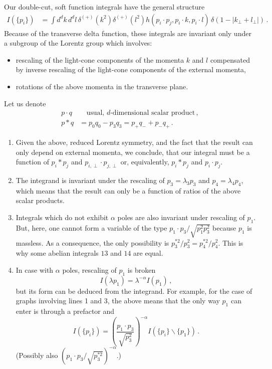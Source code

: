 \documentclass[a4paper,11pt]{report}
\numberwithin{equation}{section}
\begin{document}
Our double-cut, soft function integrals have the general structure
%
\begin{align}
I(\{p_i\}) &= \int d^dk\, d^d l\, \delta^{(+)}(k^2) \delta^{(+)}(l^2)
     h(p_i\cdot p_j, p_i\cdot k, p_i \cdot l)\,
     \delta(1-|k_\perp+l_\perp|)\,.
\end{align}
%
Because of the transverse delta function, these integrals are invariant
only under a subgroup of the Lorentz group which involves:
%
\begin{itemize}
  \item
  rescaling of the light-cone components of the momenta $k$ and $l$ compensated
  by inverse rescaling of the light-cone components of the external momenta,
  \item
  rotations of the above momenta in the transverse plane.
\end{itemize}
%
Let us denote
\begin{align}
  p\cdot q & \quad \text{usual, $d$-dimensional scalar product}\,, \\
  p * q & = p_0 q_0 - p_3 q_3 = p_+ q_- + p_- q_+\,.
\end{align}


\begin{enumerate}
  \item
  Given the above, reduced Lorentz symmetry, and the fact that the result can
  only depend on external momenta, we conclude, that our integral must be a
  function of $p_i * p_j$ and $p_{i,\perp} \cdot p_{j,\perp}$ or, equivalently,
  $p_i * p_j$ and $p_i \cdot p_j$.

  \item
  The integrand is invariant under the rescaling of $p_3 = \lambda_3 p_3$
  and $p_4 = \lambda_4 p_4$, which means that the result can only be a function
  of ratios of the above scalar products.

  \item
  Integrals which do not exhibit $\alpha$ poles are also invariant under
  rescaling of $p_1$. But, here, one cannot form a variable of the type $p_1
  \cdot p_3/\sqrt{p_1^2 p_3^2}$ because $p_1$ is massless. As a consequence, the
  only possibility is $p_3^{*2}/p_3^2 = p_4^{*2}/p_4^2 $. This is why some
  abelian integrals $13$ and $14$ are equal.

  \item
  In case with $\alpha$ poles, rescaling of $p_1$ is broken 
  \begin{displaymath}
    I(\lambda p_1) =  \lambda^{-\alpha} I(p_1)\,,
  \end{displaymath}
  but its form can be
  deduced from  the integrand. For example, for the case of graphs involving
  lines 1 and 3, the above means that the only way $p_1$ can enter is through a
  prefactor and 
  \begin{displaymath}
    I(\{p_i\}) =  \left(\frac{p_1\cdot p_3}{\sqrt{p_3^2}}\right)^{-\alpha} 
    I(\{p_i\}\backslash \{p_1\})\,.
  \end{displaymath}
  (Possibly also $\left(p_1\cdot p_3/\sqrt{p_3^{*2}}\right)^{-\alpha}$.)

\end{enumerate}
\end{document}
